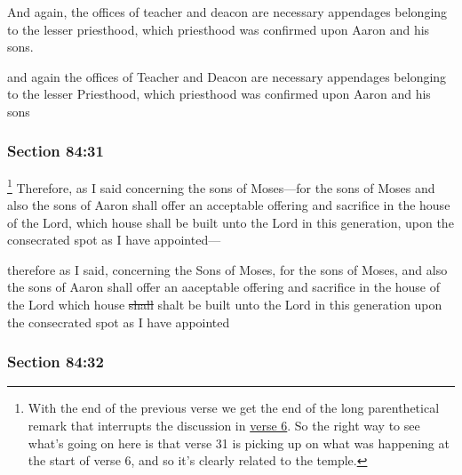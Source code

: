 		And again, the offices of teacher and deacon are necessary appendages belonging to the lesser priesthood, which priesthood was confirmed upon Aaron and his sons.

		\begin{framed}
		\scriptsize
			\begin{compactdesc}
				\item[JSP] and again the offices of Teacher and Deacon are necessary appendages belonging to the lesser Priesthood, which priesthood was confirmed upon Aaron and his sons
			\end{compactdesc}
		\end{framed}

	\subsubsection{Section 84:31} %
		\label{DC84-31}

			\footnote{%
				With the end of the previous verse we get the end of the long parenthetical remark that interrupts the discussion in \hyperref[DC84-6]{verse 6}. So the right way to see what's going on here is that verse 31 is picking up on what was happening at the start of verse 6, and so it's clearly related to the temple.
				}%
		Therefore, as I said concerning the sons of Moses---for the sons of Moses and also the sons of Aaron shall offer an acceptable offering and sacrifice in the house of the Lord, which house shall be built unto the Lord in this generation, upon the consecrated spot as I have appointed---

		\begin{framed}
		\scriptsize
			\begin{compactdesc}
				\item[JSP] therefore as I said, concerning the Sons of Moses, for the sons of Moses, and also the sons of Aaron shall offer an aaceptable offering and sacrifice in the house of the Lord which house \sout{shall} shalt be built unto the Lord in this generation upon the consecrated spot as I have appointed
			\end{compactdesc}
		\end{framed}

	\subsubsection{Section 84:32} %
		\label{DC84-32}

